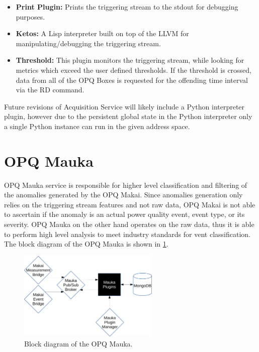 \begin{itemize}
\item{\textbf{Print Plugin:}} Prints the triggering stream to the stdout for debugging purposes. 
\item{\textbf{Ketos:}} A Lisp interpreter built on top of the LLVM for manipulating/debugging the triggering stream.
\item{\textbf{Threshold:}} This plugin monitors the triggering stream, while looking for metrics which exceed the user defined thresholds. If the threshold is crossed, data from all of the OPQ Boxes is requested for the offending time interval via the RD command.
\end{itemize}

Future revisions of Acquisition Service will likely include a Python interpreter plugin, however due to the persistent global state in the Python interpreter only a single Python instance can run in the given address space.

\section{OPQ Mauka}
OPQ Mauka service is responsible for higher level classification and filtering of the anomalies generated by the OPQ Makai. Since anomalies generation only
relies on the triggering stream features and not raw data, OPQ Makai is not able to ascertain if the anomaly is an actual power quality event, event type, or its severity. OPQ Mauka on the other hand operates on the raw data, thus it is able to perform high level analysis to meet industry standards for vent classification. The block diagram of the OPQ Mauka is shown in \ref{fig:8}.
\begin{figure}[h]
  \begin{center}
  \includegraphics[width=0.6\textwidth]{img/mauka.pdf}
  \end{center}
  \caption{Block diagram of the OPQ Mauka.}
  \label{fig:8}
\end{figure}

